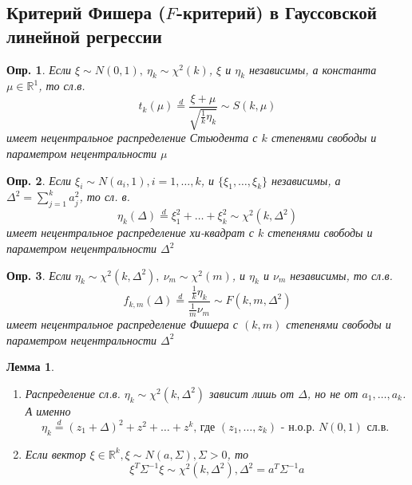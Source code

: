 \documentclass[12pt]{article}
\newtheorem{definition}{Опр.}
\newtheorem{lemma}{Лемма}
\theoremstyle{basic_theorem}
\theoremstyle{name_theorem}
\def\R{ \mathbb{R} }
\begin{document}
\subsection{Критерий Фишера (\(F\)-критерий) в Гауссовской линейной регрессии}
\begin{definition}
        Если \(\xi\sim N(0,1),\ \eta_k\sim\chi^2(k)\), \(\xi\) и \(\eta_k\)
        независимы, а константа \(\mu\in\R^1\), то сл.в.
        \[t_k(\mu)\overset{d}{=}\frac{\xi+\mu}{\sqrt{\frac{1}{k}\eta_k}}\sim S(k,\mu)\]
        имеет нецентральное распределение Стьюдента с \(k\) степенями свободы
        и параметром нецентральности \(\mu\)
\end{definition}
\begin{definition}
    Если \(\xi_i\sim N(a_i,1),i=1,\ldots,k\), и \(\{\xi_1,\ldots,\xi_k\}\)
    независимы, а \(\Delta^2=\sum_{j=1}^{k}a_j^2\), то сл. в.
    \[ \eta_k(\Delta)\overset{d}{=}\xi_1^2+\ldots+\xi_k^2\sim\chi^2(k,\Delta^2) \]
    имеет нецентральное распределение хи-квадрат с \(k\) степенями свободы
    и параметром нецентральности \(\Delta^2\)
\end{definition}
\begin{definition}
    Если \(\eta_k\sim\chi^2(k,\Delta^2),\ \nu_m\sim\chi^2(m)\), и \(\eta_k\) и \(\nu_m\)
    независимы, то сл.в.
    \[f_{k,m}(\Delta)\overset{d}{=}\frac{\frac{1}{k}\eta_k}{\frac{1}{m}\nu_m}\sim F(k,m,\Delta^2)\]
    имеет нецентральное распределение Фишера с \((k,m)\) степенями свободы и параметром
    нецентральности \(\Delta^2\)
\end{definition}
\begin{lemma} \label{delta_dependency}
    \begin{enumerate}
        \item Распределение сл.в. \(\eta_k\sim\chi^2(k,\Delta^2)\) зависит лишь
            от \(\Delta\), но не от \(a_1,\ldots,a_k\). А именно
            \[\eta_k\overset{d}{=}(z_1+\Delta)^2+z^2+\ldots+z^k \mbox{, где \((z_1,\ldots,z_k)\) - н.о.р. \(N(0,1)\) сл.в. } \]

        \item Если вектор \(\xi\in\R^k,\xi\sim N(a, \Sigma),\Sigma>0\), то
        \[\xi^T\Sigma^{-1}\xi\sim\chi^2(k,\Delta^2),\Delta^2 = a^{T}\Sigma^{-1}a\]
    \end{enumerate}
\end{lemma}
\end{document}

